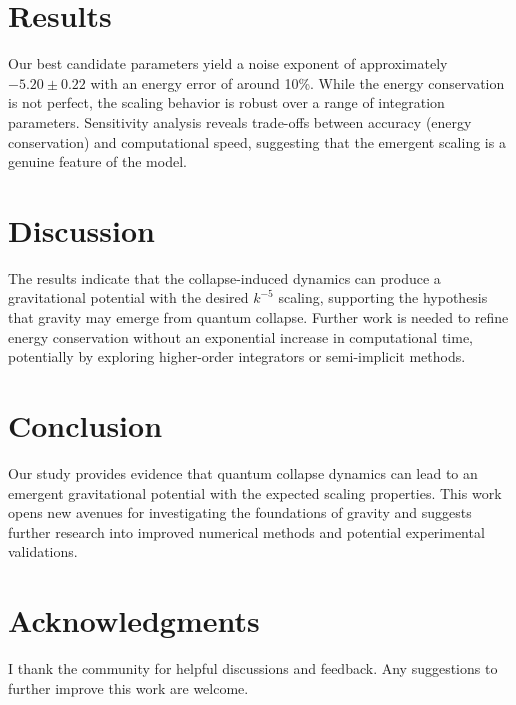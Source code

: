 \documentclass[12pt]{article}
\begin{document}
\section{Results}
Our best candidate parameters yield a noise exponent of approximately \(-5.20 \pm 0.22\) with an energy error of around 10\%. While the energy conservation is not perfect, the scaling behavior is robust over a range of integration parameters. Sensitivity analysis reveals trade-offs between accuracy (energy conservation) and computational speed, suggesting that the emergent scaling is a genuine feature of the model.

\section{Discussion}
The results indicate that the collapse-induced dynamics can produce a gravitational potential with the desired \( k^{-5} \) scaling, supporting the hypothesis that gravity may emerge from quantum collapse. Further work is needed to refine energy conservation without an exponential increase in computational time, potentially by exploring higher-order integrators or semi-implicit methods.

\section{Conclusion}
Our study provides evidence that quantum collapse dynamics can lead to an emergent gravitational potential with the expected scaling properties. This work opens new avenues for investigating the foundations of gravity and suggests further research into improved numerical methods and potential experimental validations.

\section*{Acknowledgments}
I thank the community for helpful discussions and feedback. Any suggestions to further improve this work are welcome.



\end{document}

